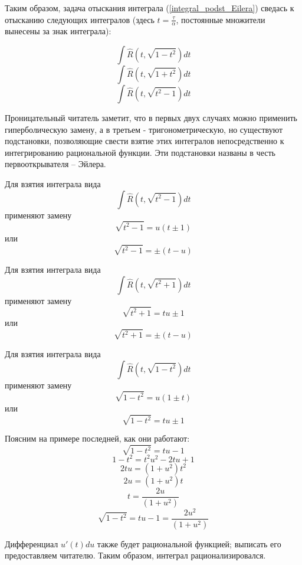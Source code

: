 Таким образом, задача отыскания интеграла (\ref{integral_podst_Eilera}) сведась к отысканию следующих интегралов (здесь $t=\frac{\tau}{\alpha}$, постоянные множители вынесены за знак интеграла):

$$
\int\hat R(t,\sqrt{1-t^2})dt
$$$$
\int\hat R(t,\sqrt{1+t^2})dt
$$$$
\int\hat R(t,\sqrt{t^2-1})dt
$$

Проницательный читатель заметит, что в первых двух случаях можно применить гиперболическую замену, а в третьем - тригонометрическую, но существуют подстановки, позволяющие свести взятие этих интегралов непосредственно к интегрированию рациональной функции. Эти подстановки названы в честь первооткрывателя -- Эйлера.

Для взятия интеграла вида
$$\int\hat R(t,\sqrt{t^2-1})dt$$
применяют замену
$$\sqrt{t^2-1}=u(t\pm 1)$$
или
$$\sqrt{t^2-1}=\pm(t-u)$$

Для взятия интеграла вида
$$\int\hat R(t,\sqrt{t^2+1})dt$$
применяют замену
$$\sqrt{t^2+1}=tu\pm 1$$
или
$$\sqrt{t^2+1}=\pm(t-u)$$

Для взятия интеграла вида
$$\int\hat R(t,\sqrt{1-t^2})dt$$
применяют замену
$$\sqrt{1-t^2}=u(1\pm t)$$
или
$$\sqrt{1-t^2}=tu\pm1$$

Поясним на примере последней, как они работают:
$$\sqrt{1-t^2}=tu-1$$
$$1-t^2=t^2 u^2 -2tu+1$$
$$2tu=(1+u^2)t^2$$
$$2u=(1+u^2)t$$
$$t=\frac{2u}{(1+u^2)}$$
$$\sqrt{1-t^2}=tu-1=\frac{2u^2}{(1+u^2)}$$

Дифференциал $u'(t)du$ также будет рациональной функцией; выписать его предоставляем читателю. Таким образом, интеграл рационализировался.
